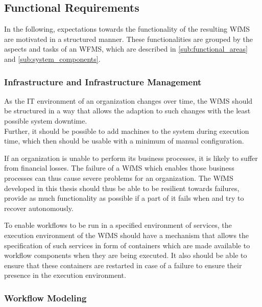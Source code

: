 
\subsection{Functional Requirements} %
  \label{sub:functional_requirements}

  In the following, expectations towards the functionality of the resulting \ac{WfMS} are motivated in a structured manner. These functionalities are grouped by the aspects and tasks of an WFMS, which are described in \ref{sub:functional_areas} and \ref{sub:system_components}.

  \subsubsection{Infrastructure and Infrastructure Management} %
    \label{ssub:infrastructure_management}

      As the IT environment of an organization changes over time, %
      the \ac{WfMS} should be structured in a way that allows the adaption to such changes with the least possible system downtime. \\
      Further, it should be possible to add machines to the system during execution time, which then should be usable with a minimum of manual configuration.

      If an organization is unable to perform its business processes, it is likely to suffer from financial losses. The failure of a \ac{WfMS} which enables those business processes can thus cause severe problems for an organization. The \ac{WfMS} developed in this thesis should thus be able to be resilient towards failures, \ie provide as much functionality as possible if a part of it fails when and try to recover autonomously.

      To enable workflows to be run in a specified environment of services, the execution environment of the \ac{WfMS} should have a mechanism that allows the specification of such services in form of containers which are made available to workflow components when they are being executed. It also should be able to ensure that these containers are restarted in case of a failure to ensure their presence in the execution environment.


  \subsubsection{Workflow Modeling} %
    \label{ssub:workflow_modeling}

